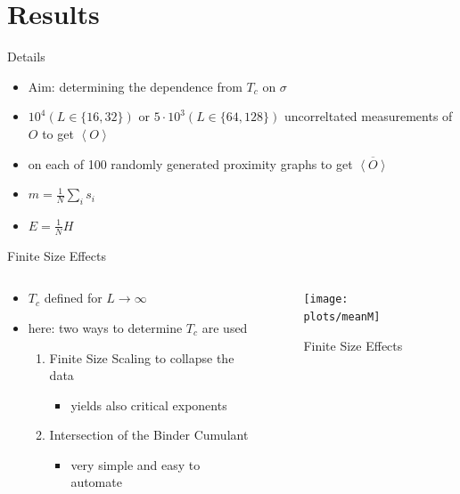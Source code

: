 \documentclass{beamer}
\newcommand{\avg}[1]{\left< #1 \right>}
\begin{document}
\section{Results}
    \begin{frame}{Details}
        \begin{itemize}[<+->]
            \item Aim: determining the dependence from \(T_{c}\) on \(\sigma\)
            \item \(10^{4} (L\in\{16,32\})\) or  \(5\cdot 10^{3} (L\in\{64,128\})\) uncorreltated measurements of \(O\) to get \(\avg{O}\)
            \item on each of 100 randomly generated proximity graphs to get \(\overline{\avg{O}}\){}
            \item \(m = \frac{1}{N} \sum_{i} s_{i}\)
            \item \(E = \frac{1}{N} H\)
        \end{itemize}
    \end{frame}

    \begin{frame}{Finite Size Effects}
        \begin{columns}[t]
            \begin{column}{5cm}
                \begin{itemize}[<+->]
                    \item \(T_{c}\) defined for \(L \to \infty\)
                    \item here: two ways to determine \(T_{c}\) are used
                    \begin{enumerate}[<+->]
                        \item Finite Size Scaling to collapse the data
                        \begin{itemize}[<+->]
                            \item yields also critical exponents
                        \end{itemize}
                        \item Intersection of the Binder Cumulant
                        \begin{itemize}[<+->]
                            \item very simple and easy to automate
                        \end{itemize}
                    \end{enumerate}
                \end{itemize}
            \end{column}
            \begin{column}{6cm}
                \begin{figure}[htbp]
                    \centering
                    \texttt{[image: plots/meanM]}
                    \caption
                    {
                        Finite Size Effects
                    }
                \end{figure}
            \end{column}
        \end{columns}
    \end{frame}
\end{document}
